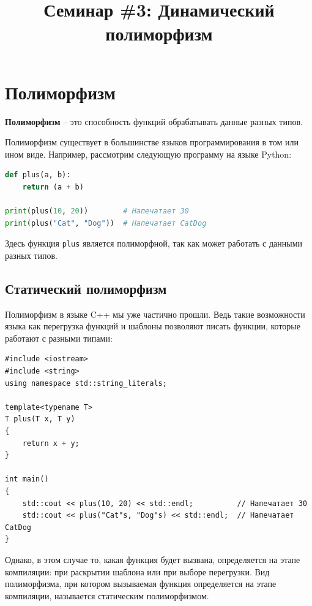 \documentclass{article}
\begin{document}
\title{Семинар \#3: Динамический полиморфизм \vspace{-5ex}}\date{}\maketitle

\section*{Полиморфизм}
\textbf{Полиморфизм} -- это способность функций обрабатывать данные разных типов.

Полиморфизм существует в большинстве языков программирования в том или ином виде. Например, рассмотрим следующую программу на языке Python:
\begin{lstlisting}[language=Python]
def plus(a, b):
    return (a + b)

print(plus(10, 20))        # Напечатает 30
print(plus("Cat", "Dog"))  # Напечатает CatDog
\end{lstlisting}
Здесь функция \texttt{plus} является полиморфной, так как может работать с данными разных типов.

\subsection*{Статический полиморфизм}
Полиморфизм в языке C++ мы уже частично прошли. Ведь такие возможности языка как перегрузка функций и шаблоны позволяют писать функции, которые работают с разными типами:
\begin{lstlisting}[style=csMiptCppStyle]
#include <iostream>
#include <string>
using namespace std::string_literals;

template<typename T>
T plus(T x, T y)
{
	return x + y;
}

int main()
{
	std::cout << plus(10, 20) << std::endl;          // Напечатает 30
	std::cout << plus("Cat"s, "Dog"s) << std::endl;  // Напечатает CatDog
}
\end{lstlisting}
Однако, в этом случае то, какая функция будет вызвана, определяется на этапе компиляции: при раскрытии шаблона или при выборе перегрузки. Вид полиморфизма, при котором вызываемая функция определяется на этапе компиляции, называется статическим полиморфизмом. 
\end{document}
